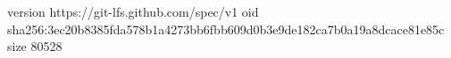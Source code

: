 version https://git-lfs.github.com/spec/v1
oid sha256:3ec20b8385fda578b1a4273bb6fbb609d0b3e9de182ca7b0a19a8dcace81e85c
size 80528
